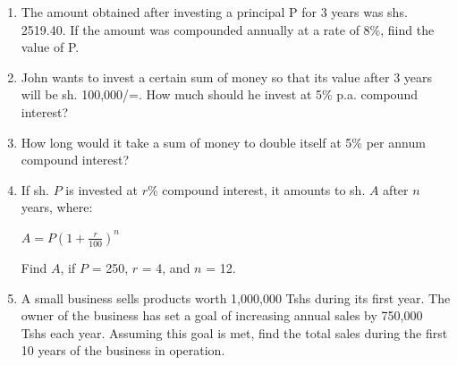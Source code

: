 \begin{enumerate}
	\item The amount obtained after investing a principal P for 3 years was shs. 2519.40. If the amount was compounded annually at a rate of 8\%, fiind the value of P.
	
	\item John wants to invest a certain sum of money so that its value after 3 years will be sh. 100,000/=. How much should he invest at 5\% p.a. compound interest?

	\item How long would it take a sum of money to double itself at 5\% per annum compound interest?
	
	\item If sh. $P$ is invested at $r$\% compound interest, it amounts to sh. $A$ after $n$ years, where:
	\begin{center}
	$A = P(1 + \frac{r}{100})^n$
	\end{center}
	\noindent Find $A$, if $P$ = 250, $r$ = 4, and $n$ = 12.
	
	\item A small business sells products worth 1,000,000 Tshs during its first year. The owner of the business has set a goal of increasing annual sales by 750,000 Tshs each year. Assuming this goal is met, find the total sales during the first 10 years of the business in operation.
	
	
	
	
\end{enumerate}
	
	
	
